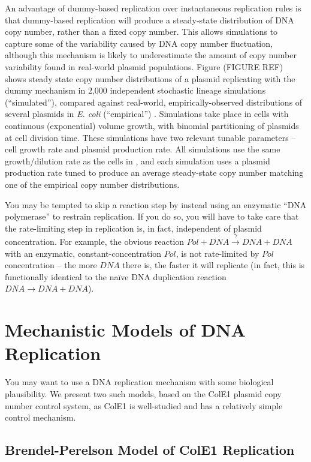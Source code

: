 \documentclass[preprint,12pt]{elsarticle}
\begin{document}
An advantage of dummy-based replication over instantaneous replication rules is that dummy-based replication will produce a steady-state distribution of DNA copy number, rather than a fixed copy number. This allows simulations to capture some of the variability caused by DNA copy number fluctuation, although this mechanism is likely to underestimate the amount of copy number variability found in real-world plasmid populations. Figure (FIGURE REF) shows steady state copy number distributions of a plasmid replicating with the dummy mechanism in 2,000 independent stochastic lineage simulations (``simulated''), compared against real-world, empirically-observed distributions of several plasmids in \emph{E. coli} (``empirical'') \cite{Shao2021}. Simulations take place in cells with continuous (exponential) volume growth, with binomial partitioning of plasmids at cell division time. These simulations have two relevant tunable parameters -- cell growth rate and plasmid production rate. All simulations use the same growth/dilution rate as the cells in \cite{Shao2021}, and each simulation uses a plasmid production rate tuned to produce an average steady-state copy number matching one of the empirical copy number distributions. 

You may be tempted to skip a reaction step by instead using an enzymatic ``DNA polymerase'' to restrain replication. If you do so, you will have to take care that the rate-limiting step in replication is, in fact, independent of plasmid concentration. For example, the obvious reaction $Pol + DNA \xrightarrow{\gamma}  DNA + DNA$ with an enzymatic, constant-concentration $Pol$, is not rate-limited by $Pol$ concentration -- the more $DNA$ there is, the faster it will replicate (in fact, this is functionally identical to the na\"ive DNA duplication reaction $DNA \rightarrow DNA + DNA$). 

\section{Mechanistic Models of DNA Replication}\label{S:mechmodels}

You may want to use a DNA replication mechanism with some biological plausibility. We present two such models, based on the ColE1 plasmid copy number control system, as ColE1 is well-studied and has a relatively simple control mechanism.

\subsection{Brendel-Perelson Model of ColE1 Replication}\label{ss:bp_full}
\end{document}
